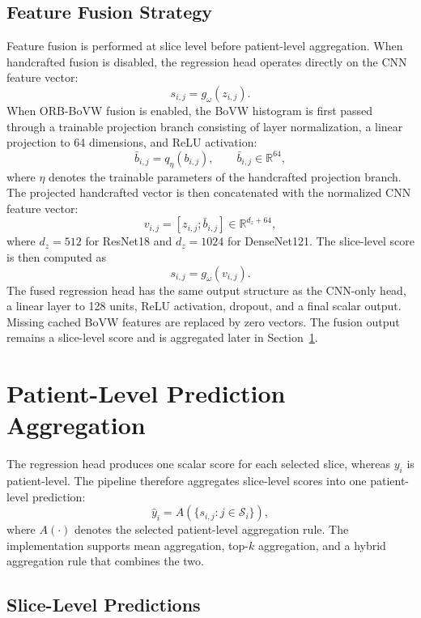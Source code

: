 \subsection{Feature Fusion Strategy}
\label{sec:feature_fusion_strategy}

Feature fusion is performed at slice level before patient-level aggregation. When handcrafted fusion is disabled, the regression head operates directly on the CNN feature vector:
\[
s_{i,j}
=
g_{\omega}(z_{i,j}).
\]
When ORB-BoVW fusion is enabled, the BoVW histogram is first passed through a trainable projection branch consisting of layer normalization, a linear projection to 64 dimensions, and ReLU activation:
\[
\bar{b}_{i,j}
=
q_{\eta}(b_{i,j}),
\qquad
\bar{b}_{i,j}
\in
\mathbb{R}^{64},
\]
where \(\eta\) denotes the trainable parameters of the handcrafted projection branch. The projected handcrafted vector is then concatenated with the normalized CNN feature vector:
\[
v_{i,j}
=
\left[
z_{i,j};
\bar{b}_{i,j}
\right]
\in
\mathbb{R}^{d_z+64},
\]
where \(d_z=512\) for ResNet18 and \(d_z=1024\) for DenseNet121. The slice-level score is then computed as
\[
s_{i,j}
=
g_{\omega}(v_{i,j}).
\]
The fused regression head has the same output structure as the CNN-only head, a linear layer to 128 units, ReLU activation, dropout, and a final scalar output. Missing cached BoVW features are replaced by zero vectors. The fusion output remains a slice-level score and is aggregated later in Section~\ref{sec:patient_level_prediction_aggregation}.



\section{Patient-Level Prediction Aggregation}
\label{sec:patient_level_prediction_aggregation}

The regression head produces one scalar score for each selected slice, whereas \(y_i\) is patient-level. The pipeline therefore aggregates slice-level scores into one patient-level prediction:
\[
\hat{y}_i
=
A\left(\{s_{i,j}: j \in \mathcal{S}_i\}\right),
\]
where \(A(\cdot)\) denotes the selected patient-level aggregation rule. The implementation supports mean aggregation, top-\(k\) aggregation, and a hybrid aggregation rule that combines the two.


\subsection{Slice-Level Predictions}
\label{sec:slice_level_predictions}

